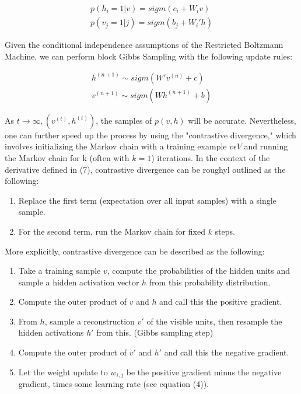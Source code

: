 \documentclass[journal]{IEEEtran}
\begin{document}
\begin{equation}
\begin{aligned}
p(h_{i} = 1|v) = sigm(c_{i} + W_{i}v)\\
p(v_{j} = 1|j) = sigm(b_{j} + W_{i}'h)
\end{aligned}
\end{equation}

Given the conditional independence assumptions of the Restricted Boltzmann Machine, we can perform block Gibbs Sampling with the following update rules:

\begin{equation}
\begin{aligned}
h^{(n+1)} \sim sigm(W'v^{(n)} + c)\\
v^{(n+1)} \sim sigm(Wh^{(n+1)} + b)
\end{aligned}
\end{equation}

As $t \rightarrow \infty,  (v^{(t)},h^{(t)})$, the samples of $p(v,h)$ will be accurate.  Nevertheless, one can further speed up the process by using the "contrastive divergence," which involves initializing the Markov chain with a training example $v \epsilon V$ and running the Markov chain for k (often with $k = 1$) iterations.  In the context of the derivative defined in (7), contrastive divergence can be roughyl outlined as the following:

\begin{enumerate}
 \item Replace the first term (expectation over all input samples) with a single sample.
 \item For the second term, run the Markov chain for fixed $k$ steps.
\end{enumerate}

More explicitly, contrastive divergence can be described as the following:

\begin{enumerate}
\item Take a training sample $v$, compute the probabilities of the hidden units and sample a hidden activation vector $h$ from this probability distribution.
\item Compute the outer product of $v$ and $h$ and call this the positive gradient.
\item From $h$, sample a reconstruction $v'$ of the visible units, then resample the hidden activations $h'$ from this. (Gibbs sampling step)
\item Compute the outer product of $v'$ and $h'$ and call this the negative gradient.
\item Let the weight update to $w_{i,j}$ be the positive gradient minus the negative gradient, times some learning rate (see equation (4)). 
\end{enumerate}
\end{document}
